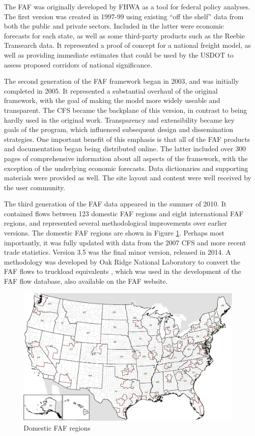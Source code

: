The FAF was originally developed by FHWA as a tool for federal policy analyses. The first version was created in 1997-99 using existing ``off the shelf'' data from both the public and private sectors. Included in the latter were economic forecasts for each state, as well as some third-party products such as the Reebie Transearch data. It represented a proof of concept for a national freight model, as well as providing immediate estimates that could be used by the USDOT to assess proposed corridors of national significance.

The second generation of the FAF framework began in 2003, and was initially completed in 2005. It represented a substantial overhaul of the original framework, with the goal of making the model more widely useable and transparent. The CFS became the backplane of this version, in contrast to being hardly used in the original work. Transparency and extensibility became key goals of the program, which influenced subsequent design and dissemination strategies. One important benefit of this emphasis is that all of the FAF products and documentation began being distributed online. The latter included over 300 pages of comprehensive information about all aspects of the framework, with the exception of the underlying economic forecasts. Data dictionaries and supporting materials were provided as well. The site layout and content were well received by the user community.

The third generation of the FAF data appeared in the summer of 2010. It contained flows between 123 domestic FAF regions and eight international FAF regions, and represented several methodological improvements over earlier versions. The domestic FAF regions are shown in Figure \ref{fig:faf-regions}. Perhaps most importantly, it was fully updated with data from the 2007 CFS and more recent trade statistics. Version 3.5 was the final minor version, released in 2014. A methodology was developed by Oak Ridge National Laboratory to convert the FAF flows to truckload equivalents \cite{battelle11}, which was used in the development of the FAF flow database, also available on the FAF website.

\begin{figure}
\centering
\includegraphics[scale=0.4]{ct/fafregions}
\caption{Domestic FAF regions}\label{fig:faf-regions}
\end{figure}

